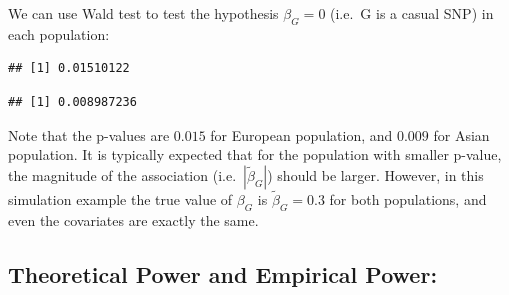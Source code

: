 \documentclass[
]{article}
\newenvironment{Shaded}{\begin{snugshade}}{\end{snugshade}}
\newcommand{\CommentTok}[1]{\textcolor[rgb]{0.56,0.35,0.01}{\textit{#1}}}
\newcommand{\DataTypeTok}[1]{\textcolor[rgb]{0.13,0.29,0.53}{#1}}
\newcommand{\DecValTok}[1]{\textcolor[rgb]{0.00,0.00,0.81}{#1}}
\newcommand{\KeywordTok}[1]{\textcolor[rgb]{0.13,0.29,0.53}{\textbf{#1}}}
\newcommand{\NormalTok}[1]{#1}
\newcommand{\OperatorTok}[1]{\textcolor[rgb]{0.81,0.36,0.00}{\textbf{#1}}}
\newcommand{\StringTok}[1]{\textcolor[rgb]{0.31,0.60,0.02}{#1}}
\begin{document}
We can use Wald test to test the hypothesis \(\beta_G = 0\) (i.e.~G is a
casual SNP) in each population:

\begin{Shaded}
\end{Shaded}

\begin{verbatim}
## [1] 0.01510122
\end{verbatim}

\begin{Shaded}
\end{Shaded}

\begin{verbatim}
## [1] 0.008987236
\end{verbatim}

Note that the p-values are \(0.015\) for European population, and
\(0.009\) for Asian population. It is typically expected that for the
population with smaller p-value, the magnitude of the association
(i.e.~\(|\tilde{\beta}_G|\)) should be larger. However, in this
simulation example the true value of \(\beta_G\) is
\(\tilde{\beta}_G=0.3\) for both populations, and even the covariates
are exactly the same.

\hypertarget{theoretical-power-and-empirical-power}{%
\subsection{Theoretical Power and Empirical
Power:}\label{theoretical-power-and-empirical-power}}
\end{document}
